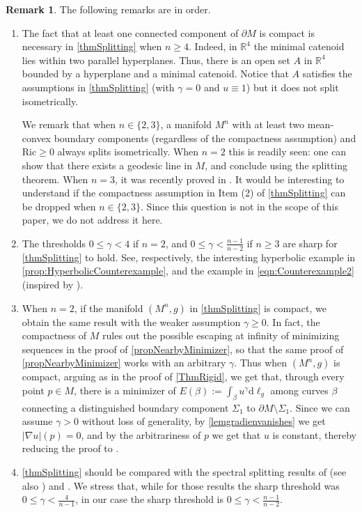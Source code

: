 \documentclass[12pt,a4paper,reqno]{amsart}
\theoremstyle{definition}
\newtheorem{remark}{Remark}
\renewcommand{\leq}{\leqslant}
\renewcommand{\geq}{\geqslant}
\begin{document}
\begin{remark}\label{rem:Thm11}
    The following remarks are in order.
    \begin{enumerate}
        \item The fact that at least one connected component of $\partial M$ is compact is necessary in \cref{thmSplitting} when $n\geq 4$. Indeed, in $\mathbb R^4$ the minimal catenoid lies within two parallel hyperplanes. Thus, there is an open set $A$ in $\mathbb R^4$ bounded by a hyperplane and a minimal catenoid. Notice that $A$ satisfies the assumptions in  \cref{thmSplitting} (with $\gamma=0$ and $u\equiv 1$) but it does not split isometrically. 
        
        We remark that when $n\in\{2,3\}$, a manifold $M^n$ with at least two mean-convex boundary components (regardless of the compactness assumption) and $\mathrm{Ric}\geq 0$ always splits isometrically. When $n=2$ this is readily seen: one can show that there exists a geodesic line in $M$, and conclude using the splitting theorem. When $n=3$, it was recently proved in \cite[Corollary 3]{CucinottaMondino}. It would be interesting to understand if the compactness assumption in Item (2) of \cref{thmSplitting} can be dropped when $n\in\{2,3\}$. Since this question is not in the scope of this paper, we do not address it here.
        \item The thresholds $0
    \leq \gamma<4$ if $n=2$, and $0\leq \gamma<\frac{n-1}{n-2}$ if $n\geq 3$ are sharp for \cref{thmSplitting} to hold. See, respectively, the interesting hyperbolic example in \cref{prop:HyperbolicCounterexample}, and the example in \cref{eqn:Counterexample2} (inspired by \cite{AX24}).
    \item When $n=2$, if the manifold $(M^n,g)$ in \cref{thmSplitting} is compact, we obtain the same result with the weaker assumption $\gamma\geq 0$. In fact, the compactness of $M$ rules out the possible escaping at infinity of minimizing sequences in the proof of \cref{propNearbyMinimizer}, so that the same proof of \cref{propNearbyMinimizer} works with an arbitrary $\gamma$. Thus when $(M^n,g)$ is compact, arguing as in the proof of \cref{ThmRigid}, we get that, through every point $p\in M$, there is a minimizer of $E(\beta):=\int_\beta u^\gamma\mathrm{d}\ell_g$ among curves $\beta$ connecting a distinguished boundary component $\Sigma_1$ to $\partial M\setminus\Sigma_1$. Since we can assume $\gamma>0$ without loss of generality, by \cref{lemgradienvanishes} we get $|\nabla u|(p)=0$, and by the arbitrariness of $p$ we get that $u$ is constant, thereby reducing the proof to \cite{Kasue83}.
    \item \cref{thmSplitting} should be compared with the spectral splitting results of \cite{APX24} (see also \cite{CatinoMariMastroliaRoncoroni}) and \cite{HongWang}. We stress that, while for those results the sharp threshold was $0\leq \gamma<\frac{4}{n-1}$, in our case the sharp threshold is $0\leq \gamma < \frac{n-1}{n-2}$. 
    

\end{enumerate}
\end{remark}
\end{document}
